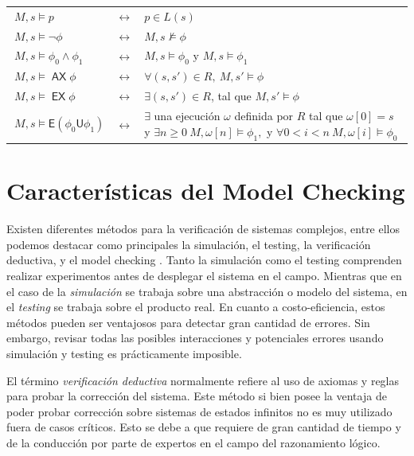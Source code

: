 \documentclass[titlepage, 12pt]{book}
\newcommand{\U}{\mathbin{\textsf{U}}}
\newcommand{\E}{\mathbin{\textsf{E}}}
\newcommand{\AX}{\mathop{\mathsf{AX}}}
\newcommand{\EX}{\mathop{\mathsf{EX}}}
\begin{document}
\begin{tabularx}{\textwidth}{@{\textbullet}lcX}
$~M,s \models p$ & $\leftrightarrow$ & $p \in L(s)$\\
$~M,s \models \neg\phi $ & $\leftrightarrow$ & $M,s \not\models \phi$\\
$~M,s \models \phi_0 \wedge \phi_1 $ & $\leftrightarrow$ & $ M,s \models \phi_0 \text{ y } M,s \models \phi_1$\\
$~M,s \models \AX\phi $ & $\leftrightarrow$ & $ \forall (s,s') \in R,~ M,s' \models \phi$\\
$~M,s \models \EX\phi $ & $\leftrightarrow$ & $ \exists (s,s') \in R$, tal que $M,s' \models \phi$\\
$~M,s \models \E(\phi_0 \U \phi_1) $ & $\leftrightarrow$ & $\exists$ una ejecuci\'on $\omega$ definida por $R$ tal que $\omega[0] = s$ y $\exists n \geq 0 ~M,\omega[n] \models \phi_1,$ y $\forall 0<i<n~ M, \omega[i] \models \phi_0$\\
\end{tabularx}








\section{Caracter\'isticas del Model Checking}

Existen diferentes m\'etodos para la verificaci\'on de sistemas complejos, entre ellos podemos destacar como principales la simulaci\'on, el testing, la verificaci\'on deductiva, y el model checking \cite{Clarke}. Tanto la simulaci\'on como el testing comprenden realizar experimentos antes de desplegar el sistema en el campo. Mientras que en el caso de la \textit{simulaci\'on} se trabaja sobre una abstracci\'on o modelo del sistema, en el \textit{testing} se trabaja sobre el producto real. En cuanto a costo-eficiencia, estos m\'etodos pueden ser ventajosos para detectar gran cantidad de errores. Sin embargo, revisar todas las posibles interacciones y potenciales errores usando simulaci\'on y testing es pr\'acticamente imposible.

El t\'ermino \textit{verificaci\'on deductiva} normalmente refiere al uso de axiomas y reglas para probar la correcci\'on del sistema. Este m\'etodo si bien posee la ventaja de poder probar correcci\'on sobre sistemas de estados infinitos no es muy utilizado fuera de casos cr\'iticos. Esto se debe a que requiere de gran cantidad de tiempo y de la conducci\'on por parte de expertos en el campo del razonamiento l\'ogico.
\end{document}

